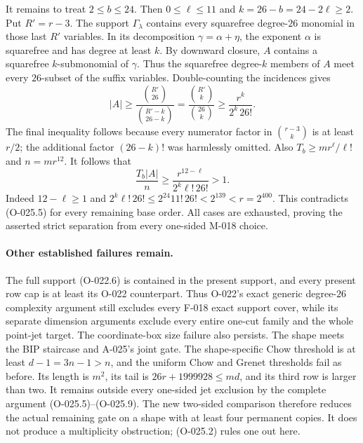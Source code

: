 It remains to treat $2\leq b\leq24$. Then
$0\leq\ell\leq11$ and
$k=26-b=24-2\ell\geq2$.
Put $R'=r-3$. The support $\Gamma_\lambda$ contains
every squarefree degree-$26$ monomial in those last
$R'$ variables. In its decomposition $\gamma=\alpha+\eta$,
the exponent $\alpha$ is squarefree and has degree at
least $k$. By downward closure, $A$ contains a
squarefree $k$-submonomial of $\gamma$.
Thus the squarefree degree-$k$ members of $A$ meet every
$26$-subset of the suffix variables. Double-counting
the incidences gives
\[
 |A|\geq
 \frac{\binom{R'}{26}}{\binom{R'-k}{26-k}}
       =\frac{\binom{R'}k}{\binom{26}k}
       \geq\frac{r^k}{2^k\,26!}.                       \tag{O-025.8}
\]
The final inequality follows because every numerator
factor in $\binom{r-3}k$ is at least $r/2$;
the additional factor $(26-k)!$ was harmlessly omitted.
Also
$T_b\geq m r^\ell/\ell!$ and $n=m r^{12}$.
It follows that
\[
 \frac{T_b|A|}{n}
       \geq\frac{r^{12-\ell}}{2^k\ell!\,26!}>1.
                                                               \tag{O-025.9}
\]
Indeed $12-\ell\geq1$ and
$2^k\ell!\,26!\leq2^{24}11!\,26!<2^{139}<r=2^{400}$.
This contradicts (O-025.5) for every remaining base order.
All cases are exhausted, proving the asserted strict
separation from every one-sided M-018 choice.

\paragraph{Other established failures remain.}
The full support (O-022.6) is contained in the present
support, and every present row cap is at least its
O-022 counterpart. Thus O-022's exact generic
degree-$26$ complexity argument still excludes every
F-018 exact support cover, while its separate dimension
arguments exclude every entire one-cut family and the
whole point-jet target.
The coordinate-box size failure also persists.
The shape meets the BIP staircase and A-025's joint gate.
The shape-specific Chow threshold is at least
$d-1=3n-1>n$, and the uniform Chow and Grenet thresholds
fail as before. Its length is $m^2$, its tail is
$26r+1999928\leq md$, and its third row is larger than two.
It remains outside every one-sided jet exclusion by the
complete argument (O-025.5)--(O-025.9).
The new two-sided comparison therefore reduces the
actual remaining gate on a shape with at least four
permanent copies. It does not produce a multiplicity
obstruction; (O-025.2) rules one out here.

